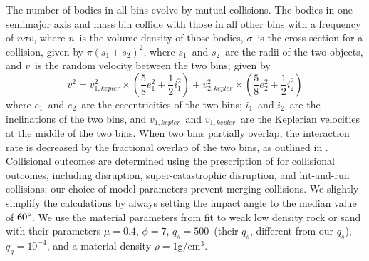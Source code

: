 \documentclass[printer]{aa}
\newcommand{\revised}{\color{black}}
\begin{document}
The number of bodies in all bins evolve by mutual collisions.  The bodies in one semimajor axis and mass bin collide with those in all other bins with a frequency of $n \sigma v$, where $n$~is the volume density of those bodies, $\sigma$~is the cross section for a collision, given by $\pi\left(s_1 + s_2\right)^{2}$, where $s_1$~and $s_2$~are the radii of the two objects, and $v$~is the random velocity between the two bins; given by \citep{1993Icar..106..190W}
\begin{equation}
    v^2 = v_{1,kepler}^2 \times \left(\frac{5}{8}e_1^2 + \frac{1}{2}i_1^2\right) + v_{2,kepler}^2 \times \left(\frac{5}{8}e_2^2 + \frac{1}{2}i_2^2\right)
\end{equation}
where $e_1$~and $e_2$~are the eccentricities of the two bins; $i_1$~and $i_2$~are the inclinations of the two bins, and $v_{1,kepler}$~and $v_{1,kepler}$~are the Keplerian velocities at the middle of the two bins.  When two bins partially overlap, the interaction rate is decreased by the fractional overlap of the two bins, as outlined in \citet{2005Icar..174..105K}.  Collisional outcomes are determined using the prescription of \citet{2012ApJ...745...79L} for collisional outcomes, including disruption, super-catastrophic disruption, and hit-and-run collisions; our choice of model parameters prevent merging collisions.  We slightly simplify the calculations by always setting the impact angle to the median value of $60\degree$.  {\revised We use the material parameters from \citet{2009ApJ...691L.133S} fit to weak low density rock or sand with their parameters $\mu = 0.4$, $\phi = 7$, $q_s = 500$~(their $q_s$, different from our $q_s$), $q_g = 10^{-4}$, and a material density $\rho = 1 $g/cm$^3$.}
\end{document}
